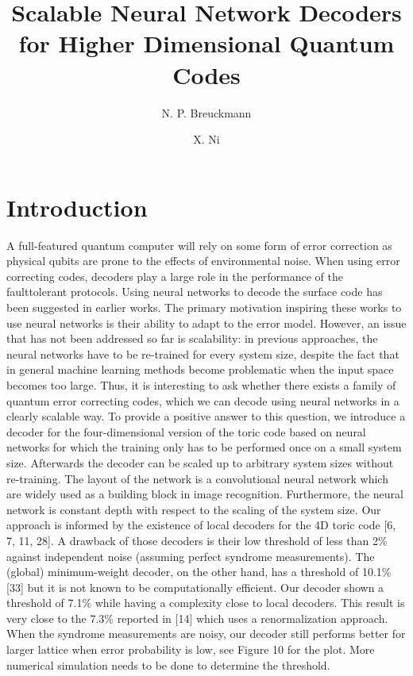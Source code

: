 \documentclass[]{compositionalityarticle}
\title{Scalable Neural Network Decoders for Higher Dimensional Quantum Codes}
\author[1]{N. P. Breuckmann}
\author[1,2]{X. Ni}
\affil[1]{Institute for Quantum Information, RWTH Aachen University, Germany}
\affil[2]{Max Planck Institute of Quantum Optics, Germany}
\begin{document}
\twocolumn
\maketitle
\merriweatherlight

\section{Introduction}

A full-featured quantum computer will rely on some form of error correction as physical qubits are prone to the effects of environmental noise. When using error correcting codes, decoders play a large role in the performance of the faulttolerant protocols. Using neural networks to decode the surface code has been suggested in earlier works. The primary motivation inspiring these works to use neural networks is their ability to adapt to the error model. However, an issue that has not been addressed so far is scalability: in previous approaches, the neural networks have to be re-trained for every system size, despite the fact that in general machine learning methods become problematic when the input space becomes too large. Thus, it is interesting to ask whether there exists a family of quantum error correcting codes, which we can decode using neural networks in a clearly scalable way.
To provide a positive answer to this question, we introduce a decoder for the four-dimensional version of the toric code based on neural networks for which the training only has to be performed once on a small system size. Afterwards the decoder can be scaled up to arbitrary system sizes without re-training. The layout of the network is a convolutional neural network which are widely used as a building block in image recognition. Furthermore, the neural network is constant depth with respect to
the scaling of the system size. Our approach is informed by the existence of local decoders for the 4D toric code [6, 7, 11, 28]. A drawback of those decoders is their low threshold of less than 2\% against independent noise (assuming perfect syndrome measurements). The (global) minimum-weight decoder, on the other hand, has a threshold of 10.1\% [33] but it is not known to be computationally efficient. Our decoder shown a threshold of 7.1\% while having a complexity close to local decoders.
This result is very close to the 7.3\% reported in [14] which uses a renormalization approach. When the syndrome measurements are noisy, our decoder still performs better for larger lattice when error probability is low, see Figure 10 for the plot. More numerical simulation needs to be done to determine the threshold. 
\end{document}
